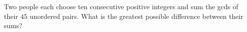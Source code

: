 Two people each choose ten consecutive positive integers and sum the gcds of their $45$ unordered pairs. What is the greatest possible difference between their sums?
